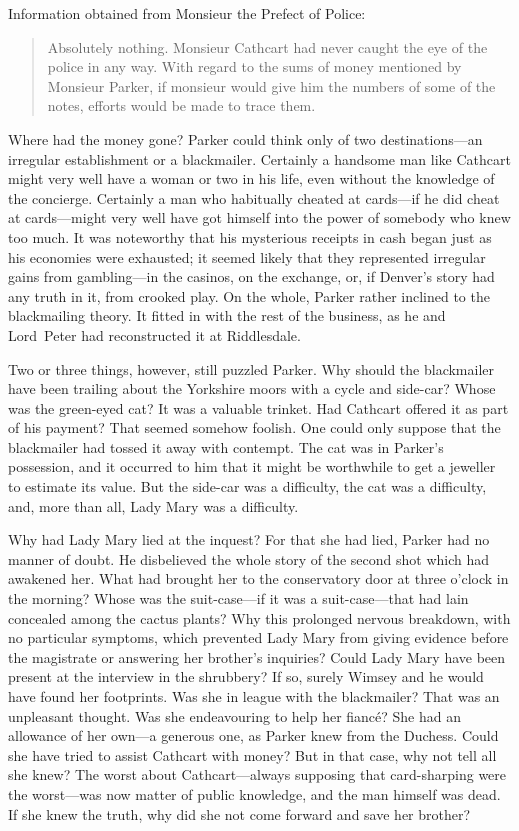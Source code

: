 Information obtained from Monsieur the Prefect of Police:

\begin{quote}
Absolutely nothing. Monsieur Cathcart had never caught the eye of the police in any way. With regard to the sums of money mentioned by Monsieur Parker, if monsieur would give him the numbers of some of the notes, efforts would be made to trace them.
\end{quote}

Where had the money gone? Parker could think only of two destinations—an irregular establishment or a blackmailer. Certainly a handsome man like Cathcart might very well have a woman or two in his life, even without the knowledge of the concierge. Certainly a man who habitually cheated at cards—if he did cheat at cards—might very well have got himself into the power of somebody who knew too much.  It was noteworthy that his mysterious receipts in cash began just as his economies were exhausted; it seemed likely that they represented irregular gains from gambling—in the casinos, on the exchange, or, if Denver's story had any truth in it, from crooked play. On the whole, Parker rather inclined to the blackmailing theory. It fitted in with the rest of the business, as he and Lord~Peter had reconstructed it at Riddlesdale.

Two or three things, however, still puzzled Parker. Why should the blackmailer have been trailing about the Yorkshire moors with a cycle and side-car? Whose was the green-eyed cat? It was a valuable trinket.  Had Cathcart offered it as part of his payment? That seemed somehow foolish. One could only suppose that the blackmailer had tossed it away with contempt. The cat was in Parker's possession, and it occurred to him that it might be worthwhile to get a jeweller to estimate its value.  But the side-car was a difficulty, the cat was a difficulty, and, more than all, Lady Mary was a difficulty.

Why had Lady Mary lied at the inquest? For that she had lied, Parker had no manner of doubt. He disbelieved the whole story of the second shot which had awakened her. What had brought her to the conservatory door at three o'clock in the morning? Whose was the suit-case—if it was a suit-case—that had lain concealed among the cactus plants? Why this prolonged nervous breakdown, with no particular symptoms, which prevented Lady Mary from giving evidence before the magistrate or answering her brother's inquiries? Could Lady Mary have been present at the interview in the shrubbery? If so, surely Wimsey and he would have found her footprints. Was she in league with the blackmailer? That was an unpleasant thought. Was she endeavouring to help her fiancé? She had an allowance of her own—a generous one, as Parker knew from the Duchess. Could she have tried to assist Cathcart with money? But in that case, why not tell all she knew? The worst about Cathcart—always supposing that card-sharping were the worst—was now matter of public knowledge, and the man himself was dead. If she knew the truth, why did she not come forward and save her brother?

